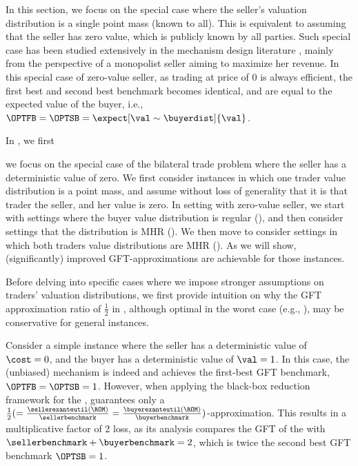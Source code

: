 
\label{sec:improved GFT}

In this section, we focus on the special case where the seller's valuation distribution is a single point mass (known to all). This is equivalent to assuming that the seller has zero value, which is publicly known by all parties. Such special case has been studied extensively in the mechanism design literature \citep[e.g.,][]{mye-81,BR-89,HR-09}, {mainly from the perspective of a monopolist seller aiming to maximize her revenue.} In this special case of zero-value seller, {as trading at price of $0$ is always efficient,} the first best and second best benchmark becomes identical, and are equal to the expected value of the buyer, i.e., $\OPTFB=\OPTSB = \expect[\val\sim\buyerdist]{\val}$. 

In , we first 

we focus on the special case of the bilateral trade problem where the seller has a deterministic value of zero. We first consider instances in which one trader value distribution is a point mass, and assume without loss of generality that it is that trader the seller, and her value is zero.
In setting with zero-value seller, we start with settings where the buyer value distribution is regular (), and then consider settings that the distribution is MHR (). 
We then move to consider settings in which both traders value distributions are MHR (). As we will show, (significantly) improved GFT-approximations are achievable for those instances. 

Before delving into specific cases where we impose stronger assumptions on traders' valuation distributions, we first provide intuition on why the 
GFT approximation ratio of $\frac{1}{2}$ in , although optimal in the worst case (e.g., ), may be conservative for general instances.

Consider a simple instance where the seller has a deterministic value of $\cost = 0$, and the buyer has a deterministic value of $\val = 1$. In this case, the (unbiased) {\RandomOffer} mechanism is indeed {\ksfair} and achieves the first-best GFT benchmark, $\OPTFB = \OPTSB = 1$. However, when applying the black-box reduction framework for the {\RandomOffer},  guarantees only a $\frac{1}{2}( = \frac{\sellerexanteutil(\ROM)}{\sellerbenchmark} = \frac{\buyerexanteutil(\ROM)}{\buyerbenchmark})$-approximation. This results in a multiplicative factor of 2 loss, as its analysis compares the GFT of the {\RandomOffer} with $\sellerbenchmark + \buyerbenchmark = 2$, which is twice the second best GFT benchmark $\OPTSB = 1$.



